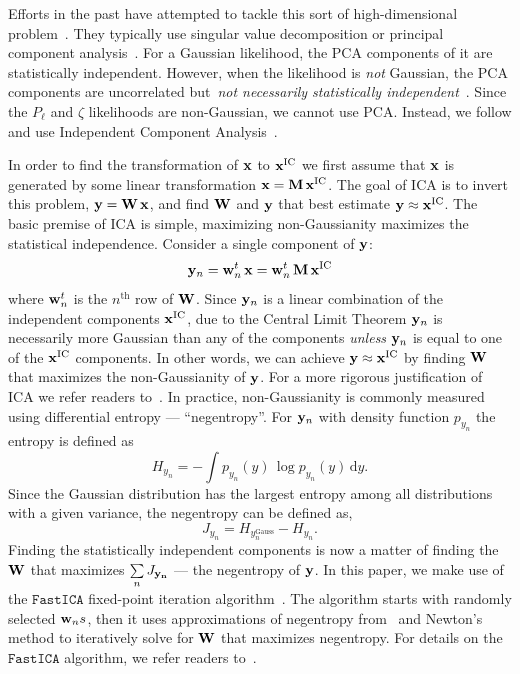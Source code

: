 \documentclass[12pt, letterpaper, preprint]{aastex}
\newcommand{\beq}{\begin{equation}}
\newcommand{\eeq}{\end{equation}}
\begin{document}
Efforts in the past have attempted to tackle this sort of 
high-dimensional problem~\citep[\emph{e.g.}][]{scoccimarro2000,eisenstein2001,gaztanaga2005,norberg2009,sinha2017a}.
They typically use singular value decomposition or principal 
component analysis~\citep[PCA;][]{Press:1992:NRC:148286}. For a Gaussian
likelihood, the PCA components of it are statistically independent. 
However, when the likelihood is \emph{not} Gaussian, the PCA components 
are uncorrelated but~\emph{not necessarily statistically independent}~\citep{hartlap2009}. 
Since the $P_\ell$ and $\zeta$ likelihoods are non-Gaussian, we cannot 
use PCA. Instead, we follow \cite{hartlap2009} and use Independent 
Component Analysis~\citep[ICA][]{herault1984,comon1994,hyvarinen2000,
hyvarinen2001independent}. 

In order to find the transformation of ${\bf x}$ to ${\bf x}^\mathrm{IC}$ 
we first assume that ${\bf x}$ is generated by some linear transformation
${\bf x} = {\bf M}\,{\bf x}^\mathrm{IC}$. The goal of ICA is to invert 
this problem, ${\bf y} = {\bf W}\,{\bf x}$, and find ${\bf W}$ and ${\bf y}$ 
that best estimate ${\bf y} \approx {\bf x}^\mathrm{IC}$. The basic 
premise of ICA is simple, maximizing non-Gaussianity maximizes the 
statistical independence. Consider a single component of ${\bf y}$: 
\beq
{\bf y}_n = {\bf w}_n^{\tiny t}\,{\bf x} = {\bf w}_n^{\tiny t}\,{\bf M}\,{\bf x}^\mathrm{IC} 
\eeq
where ${\bf w}_n^{\tiny t}$ is the $n^\mathrm{th}$ row of ${\bf W}$. 
Since ${\bf y}_n$ is a linear combination of the independent 
components ${\bf x}^\mathrm{IC}$, due to the Central Limit Theorem 
${\bf y}_n$ is necessarily more Gaussian than any of the 
components \emph{unless} ${\bf y}_n$ is equal to one of the 
${\bf x}^\mathrm{IC}$ components. In other words, we can achieve 
${\bf y} \approx {\bf x}^\mathrm{IC}$ by finding ${\bf W}$ that 
maximizes the non-Gaussianity of ${\bf y}$. For a more rigorous 
justification of ICA we refer readers to~\cite{hyvarinen2001independent}. 
In practice, non-Gaussianity is commonly measured using differential
entropy --- ``negentropy''. For ${\bf y}_n$ with density function 
$p_{y_n}$ the entropy is defined as
\beq
H_{y_n} =  - \int p_{y_n} (y)\, \log p_{y_n}(y)\, \mathrm{d}y. 
\eeq
Since the Gaussian distribution has the largest entropy among all 
distributions with a given variance, the negentropy can be defined 
as, 
\beq
J_{y_n} = H_{y_n^\mathrm{Gauss}} - H_{y_n}. 
\eeq
Finding the statistically independent components is now a matter
of finding the ${\bf W}$ that maximizes $\sum\limits_{n} J_{\bf y_n}$
--- the negentropy of ${\bf y}$. In this paper, we make use of the 
$\mathtt{FastICA}$ fixed-point iteration algorithm~\citep{hyvarinen1999}. 
The algorithm starts with randomly selected ${\bf w}_ns$, then it uses 
approximations of negentropy from~\cite{hyvarinen1998} and Newton's method 
to iteratively solve for ${\bf W}$ that maximizes negentropy. For details 
on the $\mathtt{FastICA}$ algorithm, we refer readers to~\cite{hyvarinen1999}.
\end{document}

